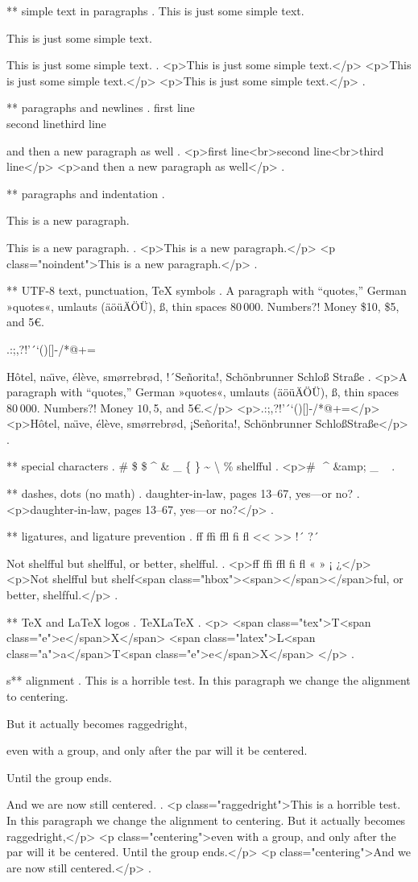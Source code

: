 ** simple text in paragraphs
.
This is just some simple text.

This is just some simple text.

This is just some simple text.
.
<p>This is just some simple text.</p>
<p>This is just some simple text.</p>
<p>This is just some simple text.</p>
.


** paragraphs and newlines
.
first line\\second line\newline third line\par and then a new paragraph as well
.
<p>ﬁrst line<br>second line<br>third line</p>
<p>and then a new paragraph as well</p>
.


** paragraphs and indentation
.
\noindent

\noindent

This is a new paragraph.

\noindent
This is a new paragraph.
.
<p>This is a new paragraph.</p>
<p class="noindent">This is a new paragraph.</p>
.


** UTF-8 text, punctuation, TeX symbols
.
A para\-graph with “quotes,” German »quotes«, umlauts (äöüÄÖÜ), ß, thin spaces 80\,000. Numbers?! Money \$10, \$5, and 5€.

.:;,?!'´`()[]-/*@+=

H\^otel, na\"\i ve, \'el\`eve, sm\o rrebr\o d, !´Se\~norita!, Sch\"onbrunner Schlo\ss{} Stra\ss e
.
<p>A para­graph with “quotes,” German »quotes«, umlauts (äöüÄÖÜ), ß, thin spaces 80 000. Numbers?! Money $10, $5, and 5€.</p>
<p>.:;,?!’´‘()[]‐/*@+=</p>
<p>Hôtel, naı̈ve, élève, smørrebrød, ¡Señorita!, Schönbrunner Schloß​ Straße</p>
.


** special characters
.
\# \$ \$ \^{} \& \_ \{ \} \~{} \textbackslash{} \% shelf\-ful
.
<p># $ $ ^​ &amp; _ { } ~​ \​ %
.


** dashes, dots (no math)
.
daughter-in-law, pages 13--67, yes---or no?
.
<p>daughter‐in‐law, pages 13–67, yes—or no?</p>
.


** ligatures, and ligature prevention
.
ff ffi ffl fi fl << >> !´ ?´

Not shelfful but shelf\mbox{}ful, or better, shelf\/ful.
.
<p>ﬀ ﬃ ﬄ ﬁ ﬂ « » ¡ ¿</p>
<p>Not shelﬀul but shelf<span class="hbox"><span></span></span>ful, or better, shelf‌ful.</p>
.


** TeX and LaTeX logos
.
\TeX \LaTeX
.
<p>
<span class="tex">T<span class="e">e</span>X</span>
<span class="latex">L<span class="a">a</span>T<span class="e">e</span>X</span>
</p>
.


s** alignment
.
This is a horrible test.
\centering
In this paragraph we change the alignment to centering.
{\raggedright But it actually becomes raggedright,

even with a group, and only after the par will it be centered.}
Until the group ends.

And we are now still centered.
.
<p class="raggedright">This is a horrible test. In this paragraph we change the alignment to centering. But it actually becomes raggedright,</p>
<p class="centering">even with a group, and only after the par will it be centered.​ Until the group ends.</p>
<p class="centering">And we are now still centered.</p>
.
